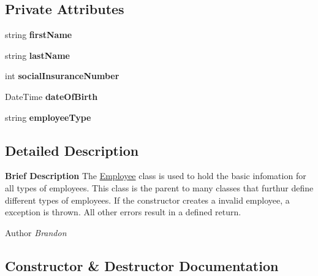 \subsection*{Private Attributes}
\begin{DoxyCompactItemize}
\item 
\hypertarget{class_all_employees_1_1_employee_a04c4c16015aa2d889fd2042ce4b8a1d7}{}string {\bfseries first\+Name}\label{class_all_employees_1_1_employee_a04c4c16015aa2d889fd2042ce4b8a1d7}

\item 
\hypertarget{class_all_employees_1_1_employee_ac3721b61919ca9cd29a400620562170e}{}string {\bfseries last\+Name}\label{class_all_employees_1_1_employee_ac3721b61919ca9cd29a400620562170e}

\item 
\hypertarget{class_all_employees_1_1_employee_a31f55bb91fe0871c5d9a3cb77f44a4df}{}int {\bfseries social\+Insurance\+Number}\label{class_all_employees_1_1_employee_a31f55bb91fe0871c5d9a3cb77f44a4df}

\item 
\hypertarget{class_all_employees_1_1_employee_a00f33298e4408f0a0402a34c9aa2067a}{}Date\+Time {\bfseries date\+Of\+Birth}\label{class_all_employees_1_1_employee_a00f33298e4408f0a0402a34c9aa2067a}

\item 
\hypertarget{class_all_employees_1_1_employee_a246198254823dc5a10197029b17479b4}{}string {\bfseries employee\+Type}\label{class_all_employees_1_1_employee_a246198254823dc5a10197029b17479b4}

\end{DoxyCompactItemize}


\subsection{Detailed Description}
{\bfseries Brief Description} The \hyperlink{class_all_employees_1_1_employee}{Employee} class is used to hold the basic infomation for all types of employees. This class is the parent to many classes that furthur define different types of employees. If the constructor creates a invalid employee, a exception is thrown. All other errors result in a defined return. 

\begin{DoxyAuthor}{Author}
{\itshape Brandon} 
\end{DoxyAuthor}


\subsection{Constructor \& Destructor Documentation}
\hypertarget{class_all_employees_1_1_employee_ac3aa5a59bf1ddba2c45cc933bf897e04}{}
